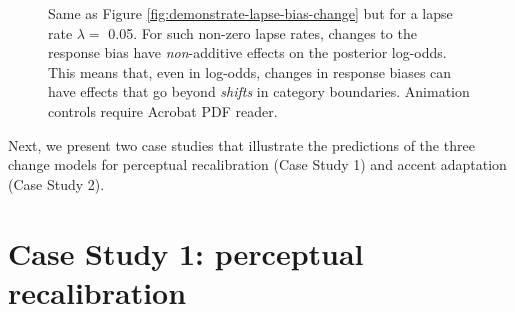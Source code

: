 \documentclass[
  11pt,
  english,
  man,floatsintext]{apa6}
\begin{document}
\begin{figure}

{\centering {}

}

\caption[Same as Figure \ref{fig:demonstrate-lapse-bias-change} but for a lapse rate \(\lambda=\) 0.05. For such non-zero lapse rates, changes to the response bias have \emph{non}-additive effects on the posterior log-odds. This means that, even in log-odds, changes in response biases can have effects that go beyond \emph{shifts} in category boundaries. Animation controls require Acrobat PDF reader.]{Same as Figure \ref{fig:demonstrate-lapse-bias-change} but for a lapse rate \(\lambda=\) 0.05. For such non-zero lapse rates, changes to the response bias have \emph{non}-additive effects on the posterior log-odds. This means that, even in log-odds, changes in response biases can have effects that go beyond \emph{shifts} in category boundaries. Animation controls require Acrobat PDF reader.}\label{fig:demonstrate-lapse-bias-change-nonzero-lapse}
\end{figure}

Next, we present two case studies that illustrate the predictions of the three change models for perceptual recalibration (Case Study 1) and accent adaptation (Case Study 2).

\hypertarget{case-study-1-perceptual-recalibration}{%
\section{Case Study 1: perceptual recalibration}\label{case-study-1-perceptual-recalibration}}
\end{document}

